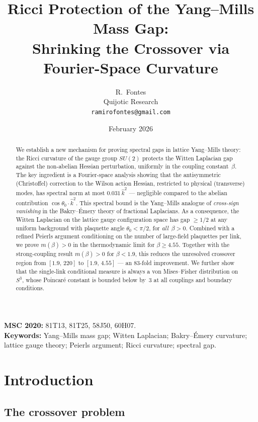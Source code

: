\documentclass[11pt,a4paper]{article}
\title{Ricci Protection of the Yang--Mills Mass Gap:\\
Shrinking the Crossover via Fourier-Space Curvature}
\author{R.\ Fontes\\
Quijotic Research\\
\texttt{ramirofontes@gmail.com}}
\date{February 2026}
\theoremstyle{plain}
\theoremstyle{definition}
\theoremstyle{remark}
\newcommand{\khat}{\hat{k}}
\begin{document}
\maketitle

\begin{abstract}
We establish a new mechanism for proving spectral gaps
in lattice Yang--Mills theory: the Ricci curvature of the
gauge group $SU(2)$ protects the Witten Laplacian gap against
the non-abelian Hessian perturbation, uniformly in the
coupling constant~$\beta$.
The key ingredient is a Fourier-space analysis showing that
the antisymmetric (Christoffel) correction to the Wilson action
Hessian, restricted to physical (transverse) modes, has spectral
norm at most $0.031\,\khat^2$ --- negligible compared to the
abelian contribution $\cos\theta_0\cdot\khat^2$.
This spectral bound is the Yang--Mills analogue of
\emph{cross-sign vanishing} in the Bakry--\'Emery theory
of fractional Laplacians.
As a consequence, the Witten Laplacian on the lattice gauge
configuration space has gap $\geq 1/2$ at any uniform background
with plaquette angle $\theta_0 < \pi/2$, for \emph{all}~$\beta > 0$.
Combined with a refined Peierls argument conditioning on the
number of large-field plaquettes per link, we prove
$m(\beta) > 0$ in the thermodynamic limit for $\beta \geq 4.55$.
Together with the strong-coupling result $m(\beta) > 0$ for
$\beta < 1.9$, this reduces the unresolved crossover region
from $[1.9,\, 220]$ to $[1.9,\, 4.55]$ --- an 83-fold improvement.
We further show that the single-link conditional measure
is always a von Mises--Fisher distribution on $S^3$,
whose Poincar\'e constant is bounded below by~$3$ at all
couplings and boundary conditions.
\end{abstract}

\medskip\noindent
\textbf{MSC 2020:} 81T13, 81T25, 58J50, 60H07.\\
\textbf{Keywords:} Yang--Mills mass gap; Witten Laplacian;
Bakry--\'Emery curvature; lattice gauge theory; Peierls argument;
Ricci curvature; spectral gap.


\section{Introduction}\label{sec:intro}

\subsection{The crossover problem}
\end{document}
